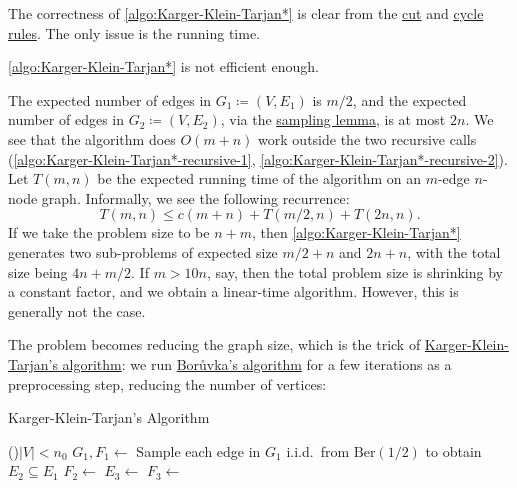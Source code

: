 The correctness of \autoref{algo:Karger-Klein-Tarjan*} is clear from the \hyperref[lma:cut-rule]{cut} and \hyperref[lma:cycle-rule]{cycle rules}. The only issue is the running time.

\begin{claim}
	\autoref{algo:Karger-Klein-Tarjan*} is not efficient enough.
\end{claim}
\begin{explanation}
	The expected number of edges in \(G_1 \coloneqq (V, E_1)\) is \(m / 2\), and the expected number of edges in \(G_2 \coloneqq (V, E_2)\), via the \hyperref[lma:sampling]{sampling lemma}, is at most \(2n\). We see that the algorithm does \(O(m + n)\) work outside the two recursive calls (\autoref{algo:Karger-Klein-Tarjan*-recursive-1}, \autoref{algo:Karger-Klein-Tarjan*-recursive-2}). Let \(T(m, n)\) be the expected running time of the algorithm on an \(m\)-edge \(n\)-node graph. Informally, we see the following recurrence:
	\[
		T(m, n)
		\leq c(m+n) + T(m / 2, n) + T(2n, n).
	\]
	If we take the problem size to be \(n + m\), then \autoref{algo:Karger-Klein-Tarjan*} generates two sub-problems of expected size \(m / 2 + n\) and \(2n + n\), with the total size being \(4n + m / 2\). If \(m > 10n\), say, then the total problem size is shrinking by a constant factor, and we obtain a linear-time algorithm. However, this is generally not the case.
\end{explanation}

The problem becomes reducing the graph size, which is the trick of \hyperref[algo:Karger-Klein-Tarjan]{Karger-Klein-Tarjan's algorithm}: we run \hyperref[algo:Boruvka]{Borůvka's algorithm} for a few iterations as a preprocessing step, reducing the number of vertices:

\begin{algorithm}[H]\label{algo:Karger-Klein-Tarjan}
	\DontPrintSemicolon
	\caption{Karger-Klein-Tarjan's Algorithm~\cite{karger1995randomized}}
	\BlankLine
	\If(){\(\lvert V \rvert < n_0\)}{
	}
	\;
	\(G_1, F_1 \gets\)\label{algo:Karger-Klein-Tarjan-Boruvka}
	\;
	Sample each edge in \(G_1\) i.i.d.\ from \(\mathrm{Ber} (1 / 2)\) to obtain \(E_2 \subseteq E_1\)\;
	\(F_2 \gets\)
	\(E_3 \gets\)
	\(F_3 \gets\)
	\;
\end{algorithm}


